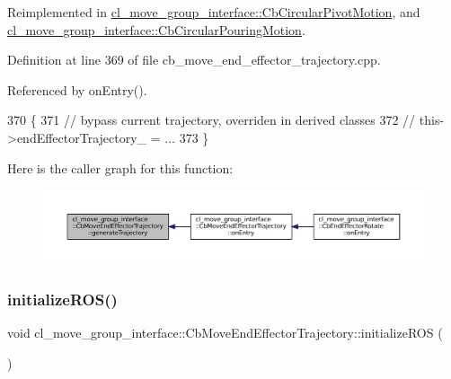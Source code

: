 Reimplemented in \hyperlink{classcl__move__group__interface_1_1CbCircularPivotMotion_a8d019ec6b9b26a2af0740b915d441a40}{cl\+\_\+move\+\_\+group\+\_\+interface\+::\+Cb\+Circular\+Pivot\+Motion}, and \hyperlink{classcl__move__group__interface_1_1CbCircularPouringMotion_a9150bb3731082aad3af2d7d6e067a344}{cl\+\_\+move\+\_\+group\+\_\+interface\+::\+Cb\+Circular\+Pouring\+Motion}.



Definition at line 369 of file cb\+\_\+move\+\_\+end\+\_\+effector\+\_\+trajectory.\+cpp.



Referenced by on\+Entry().


\begin{DoxyCode}
370     \{
371         \textcolor{comment}{// bypass current trajectory, overriden in derived classes}
372         \textcolor{comment}{// this->endEffectorTrajectory\_ = ...}
373     \}
\end{DoxyCode}
Here is the caller graph for this function\+:
\nopagebreak
\begin{figure}[H]
\begin{center}
\leavevmode
\includegraphics[width=350pt]{classcl__move__group__interface_1_1CbMoveEndEffectorTrajectory_aeae938ab66e18ab7d2fb2427bc83647b_icgraph}
\end{center}
\end{figure}
\mbox{\label{classcl__move__group__interface_1_1CbMoveEndEffectorTrajectory_afcee8f3853a5cef8806137a304c8a14b}} 
\subsubsection{\texorpdfstring{initialize\+R\+O\+S()}{initializeROS()}}
{\footnotesize\ttfamily void cl\+\_\+move\+\_\+group\+\_\+interface\+::\+Cb\+Move\+End\+Effector\+Trajectory\+::initialize\+R\+OS (\begin{DoxyParamCaption}{ }\end{DoxyParamCaption})\hspace{0.3cm}{\ttfamily [private]}}



